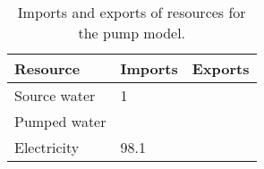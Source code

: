 \begin{table}[h]
	\centering
	\caption{Imports and exports of resources for the pump model.} \label{tab:pump_imports_exports}
	\begin{tabular}{lll}
		\toprule
		Resource  & Imports & Exports \\
		\midrule
		Source water & 1 & \\
		Pumped water &  & \\
		Electricity & 98.1 & \\
		\bottomrule
	\end{tabular}
\end{table}

